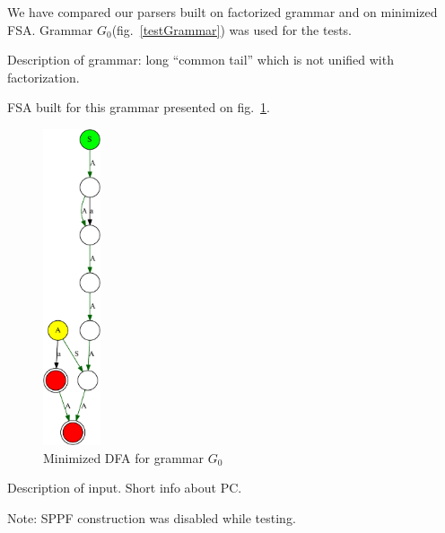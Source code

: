 \documentclass[runningheads,a4paper]{llncs}
\begin{document}
We have compared our parsers built on factorized grammar and on minimized FSA.
Grammar $G_0$(fig.~\ref{testGrammar}) was used for the tests.

Description of grammar: long ``common tail'' which is not unified with factorization.

FSA built for this grammar presented on fig.~\ref{dfa}.

\begin{figure}
\centering
\includegraphics[width=0.15\textwidth]{pictures/minimizedDFA.pdf}
\caption{\label{dfa}Minimized DFA for grammar $G_0$}
\end{figure}

Description of input. 
Short info about PC.

Note: SPPF construction was disabled while testing.
\end{document}
